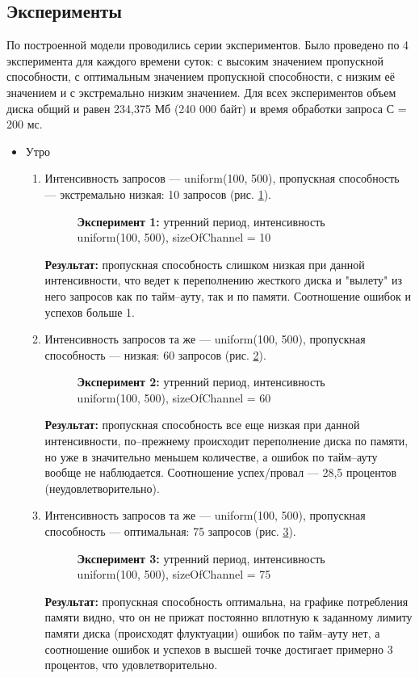 \subsection{Эксперименты}
По построенной модели проводились серии экспериментов. Было проведено по 4 эксперимента для
каждого времени суток: с высоким значением пропускной способности, с оптимальным значением
пропускной способности, с низким её значением и с экстремально низким значением. Для всех
экспериментов объем диска общий и равен 234,375 Мб (240 000 байт) и время обработки запроса С = 200 мс.
\begin{itemize}
    \item Утро
    \begin{enumerate}
        \item Интенсивность запросов --- uniform(100, 500), пропускная способность --- экстремально низкая:
        10 запросов (рис. \ref{mor1}).
        \begin{figure} [h]
            \caption{\textbf{Эксперимент 1:} утренний период, интенсивность uniform(100, 500), sizeOfChannel = 10}
            \label{mor1}
        \end{figure}
        \textbf{Результат:} пропускная способность слишком низкая при данной интенсивности,
        что ведет к переполнению жесткого диска и "вылету" из него запросов как по тайм--ауту, так и по памяти.
        Соотношение ошибок и успехов больше 1. 

        \item Интенсивность запросов та же --- uniform(100, 500), пропускная способность --- низкая: 60 запросов
        (рис. \ref{mor2}).
        \begin{figure} [h]
            \caption{\textbf{Эксперимент 2:} утренний период, интенсивность uniform(100, 500), sizeOfChannel = 60}
            \label{mor2}
        \end{figure}
        \textbf{Результат:} пропускная способность все еще низкая при данной интенсивности, по--прежнему
        происходит переполнение диска по памяти, но уже в значительно меньшем количестве, а ошибок по
        тайм--ауту вообще не наблюдается. Соотношение успех/провал --- 28,5 процентов (неудовлетворительно).

        \item Интенсивность запросов та же --- uniform(100, 500), пропускная способность --- оптимальная:
        75 запросов (рис. \ref{mor3}).
        \begin{figure} [h]
            \caption{\textbf{Эксперимент 3:} утренний период, интенсивность uniform(100, 500), sizeOfChannel = 75}
            \label{mor3}
        \end{figure}
        \textbf{Результат:} пропускная способность оптимальна, на графике потребления
        памяти видно, что он не прижат постоянно вплотную к заданному лимиту памяти диска (происходят флуктуации)
        ошибок по тайм--ауту нет, а соотношение ошибок и успехов в высшей точке достигает примерно 3 процентов,
        что удовлетворительно.


\end{enumerate}
\end{itemize}
